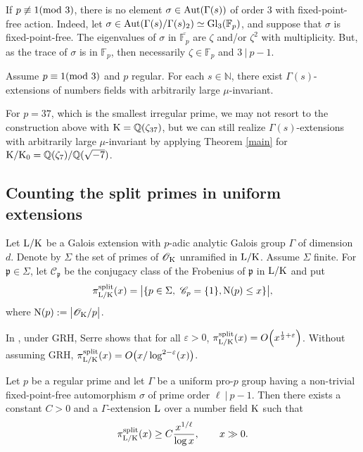 \documentclass[12pt,a4paper,twoside,english]{smfart}
\def\K{{\rm K}}
\def\L{{\rm L}}
\def\Q{{\mathbb Q}}
\def\fq{{\mathbb F}}
\def\Nat{{\mathbb N}}
\def\N{{\rm N}}
\def\C{{\mathcal C}}
\def\O{{\mathcal O}}
\def\p{{\mathfrak p}}
\def\Gl{{\rm Gl}}
\def\Aut{{\rm Aut}}
\def\mod{{\rm mod}}
\newcommand{\bigO}[1]{\ensuremath{\mathop{}\mathopen{}O\mathopen{}\left(#1\right)}}
\begin{document}
 \begin{rema}
  If $p\not \equiv 1 (\mod \ 3)$, there is no element $\sigma \in \Aut(\Gamma(s))$ of order $3$ with fixed-point-free action. Indeed, let $\sigma \in \Aut(\Gamma(s)/\Gamma(s)_2) \simeq  \Gl_3(\fq_p)$,  and suppose that $\sigma$ is fixed-point-free. The eigenvalues of $\sigma$ in $\overline{\fq_p}$ are $\zeta$ and/or $\zeta^2$ with multiplicity. But, as the trace of $\sigma$ is in $\fq_p$, then necessarily $\zeta \in \fq_p$ and $3 ~|~ p-1$.  
 \end{rema}

 
\begin{coro}
Assume $p \equiv 1 (\mod \ 3)$ and $p$ regular. For each $s \in \Nat$, there exist $\Gamma(s)$-extensions of numbers fields with arbitrarily large $\mu$-invariant.
\end{coro}
 
 \begin{rema}
 For $p=37$, which is the smallest irregular prime, we may not resort to the construction above with $\K=\Q(\zeta_{37})$, but we can still realize $\Gamma(s)$-extensions with arbitrarily large $\mu$-invariant by applying Theorem \ref{main} for $\K/\K_0=\Q(\zeta_7)/\Q(\sqrt{-7})$.
 \end{rema}
 
 
 
 
 \subsection{Counting the split primes in uniform extensions}
 Let $\L/\K$ be a Galois extension with $p$-adic analytic Galois group  $\Gamma$ of dimension $d$. Denote by $\Sigma$ the set of primes of  $\O_\K$ unramified in $\L/\K$. Assume $\Sigma$ finite. For   $\p \in \Sigma$, let $\C_\p$ be the conjugacy class of the Frobenius of $\p$ in $\L/\K$ and put $$\pi_{\L/\K}^{\mathrm{split}}(x)=\big|\{\p\in \Sigma, \ \C_\p=\{1\}, \N(\p) \leq x\} \big|,$$
 where $\N(\p):=\big|\O_\K/\p\big|$.
 
In \cite[Corollary 1 of Theorem 10]{Serre}, under GRH, Serre shows that for all $\varepsilon > 0$, $\pi_{\L/\K}^{\mathrm{split}}(x) = \bigO{x^{\frac{1}{2}+\varepsilon}}$. Without assuming GRH,  $\pi_{\L/\K}^{\mathrm{split}}(x) = \bigO{x/\log^{2-\varepsilon}(x)}$.
 

 
 \begin{prop}
Let $p$ be a regular prime and let  $\Gamma$ be a  uniform pro-$p$ group having a non-trivial fixed-point-free automorphism $\sigma$ of prime order $\ell ~|~ p-1$. 
Then there exists a constant $C>0$ and a $\Gamma$-extension $\L$ over a number field $\K$ such that
$$\pi_{\L/\K}^{\mathrm{split}}(x) \geq  C \frac{x^{1/\ell}}{\log x}, \qquad x\gg 0.$$
\end{prop}
 
\end{document}

